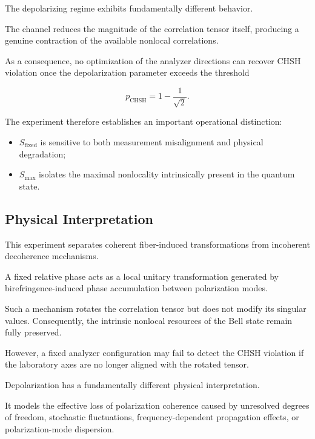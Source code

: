 \medskip

The depolarizing regime exhibits fundamentally different behavior.

The channel reduces the magnitude of the correlation tensor itself, producing a genuine contraction of the available nonlocal correlations.

As a consequence, no optimization of the analyzer directions can recover CHSH violation once the depolarization parameter exceeds the threshold

\[
p_{\mathrm{CHSH}}
=
1-\frac{1}{\sqrt{2}}.
\]

The experiment therefore establishes an important operational distinction:

\begin{itemize}
    \item \(S_{\mathrm{fixed}}\) is sensitive to both measurement misalignment and physical degradation;
    \item \(S_{\max}\) isolates the maximal nonlocality intrinsically present in the quantum state.
\end{itemize}


\subsection*{Physical Interpretation}

This experiment separates coherent fiber-induced transformations from incoherent decoherence mechanisms.

A fixed relative phase acts as a local unitary transformation generated by birefringence-induced phase accumulation between polarization modes.

Such a mechanism rotates the correlation tensor but does not modify its singular values. Consequently, the intrinsic nonlocal resources of the Bell state remain fully preserved.

However, a fixed analyzer configuration may fail to detect the CHSH violation if the laboratory axes are no longer aligned with the rotated tensor.

\medskip

Depolarization has a fundamentally different physical interpretation.

It models the effective loss of polarization coherence caused by unresolved degrees of freedom, stochastic fluctuations, frequency-dependent propagation effects, or polarization-mode dispersion.

